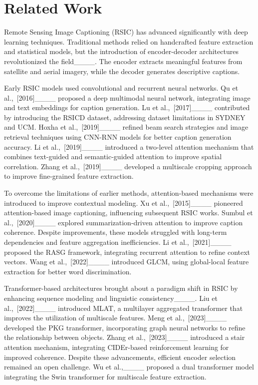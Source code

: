 \section{Related Work}
\label{sec_relwork}
Remote Sensing Image Captioning (RSIC) has advanced significantly with deep learning techniques. Traditional methods relied on handcrafted feature extraction and statistical models, but the introduction of encoder-decoder architectures revolutionized the field____. The encoder extracts meaningful features from satellite and aerial imagery, while the decoder generates descriptive captions. 

Early RSIC models used convolutional and recurrent neural networks. Qu et al.,~[2016]____ proposed a deep multimodal neural network, integrating image and text embeddings for caption generation. Lu et al.,~[2017]____ contributed by introducing the RSICD dataset, addressing dataset limitations in SYDNEY and UCM. Hoxha et al.,~[2019]____ refined beam search strategies and image retrieval techniques using CNN-RNN models for better caption generation accuracy. Li et al.,~[2019]____ introduced a two-level attention mechanism that combines text-guided and semantic-guided attention to improve spatial correlation. Zhang et al.,~[2019]____ developed a multiscale cropping approach to improve fine-grained feature extraction.

To overcome the limitations of earlier methods, attention-based mechanisms were introduced to improve contextual modeling. Xu et al.,~[2015]____ pioneered attention-based image captioning, influencing subsequent RSIC works. Sumbul et al.,~[2020]____ explored summarization-driven attention to improve caption coherence. Despite improvements, these models struggled with long-term dependencies and feature aggregation inefficiencies. Li et al.,~[2021]____ proposed the RASG framework, integrating recurrent attention to refine context vectors. Wang et al.,~[2022]____ introduced GLCM, using global-local feature extraction for better word discrimination.

Transformer-based architectures brought about a paradigm shift in RSIC by enhancing sequence modeling and linguistic consistency____. Liu et al.,~[2022]____ introduced MLAT, a multilayer aggregated transformer that improves the utilization of multiscale features. Meng et al.,~[2023]____ developed the PKG transformer, incorporating graph neural networks to refine the relationship between objects. Zhang et al.,~[2023]____ introduced a stair attention mechanism, integrating CIDEr-based reinforcement learning for improved coherence. Despite these advancements, efficient encoder selection remained an open challenge. Wu et al.,____ proposed a dual transformer model integrating the Swin transformer for multiscale feature extraction.

